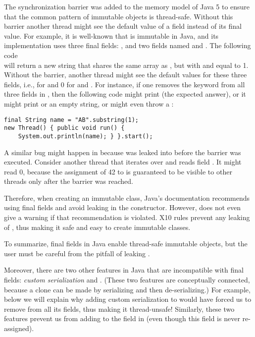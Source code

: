 The synchronization barrier was added to the memory model of Java 5
    to ensure that the common pattern of immutable objects is thread-safe.
Without this barrier another thread might see the default value of a field
    instead of its final value.
For example, it is well-known that  is immutable in Java,
    and its implementation uses three {final} fields:
    , and two  fields named  and .
The following code
    ~~\\
will return a new string 
    that shares
    the same  array as , %
    but with  and  equal to 1.
Without the barrier, %
    another thread might see the default values for these three fields,
    i.e.,  for  and 0 for  and .
For instance,
    if one removes the  keyword from all three fields in ,
    then
    the following code might print  (the expected answer),
    or it might print
     or an empty string,
    or might even throw a :
\vspace{-0.2cm}\begin{lstlisting}
final String name = "AB".substring(1);
new Thread() { public void run() {
    System.out.println(name); } }.start();
\end{lstlisting}\vspace{-0.2cm}

A similar bug might happen in 
    because \this was leaked into  before the barrier was executed.
Consider another thread that iterates over  and reads field .
It might read 0, because the assignment of 42 to  is guaranteed to be visible to other threads
    only after the barrier was reached.

Therefore, when creating an immutable class,
    Java's documentation recommends using final fields
    and avoid leaking \this in the constructor.
However,  does not even give a warning if that recommendation is violated.
X10 rules prevent any leaking of \this,
    thus making it safe and easy to create immutable classes.

To summarize, final fields in Java
    enable thread-safe immutable objects,
    but the user must be careful from the pitfall of leaking \this.

Moreover, there are two other features in Java that are incompatible with {final} fields:
    \emph{custom serialization} and .
(These two features are conceptually connected,
    because a clone can be made by serializing and then de-serializing.)
For example, below we will explain why adding custom serialization to 
    would have forced us to remove  from all its fields,
    thus making it thread-unsafe!
Similarly, these two features prevent us from adding  to the 
    field in 
    (even though this field is never re-assigned).


